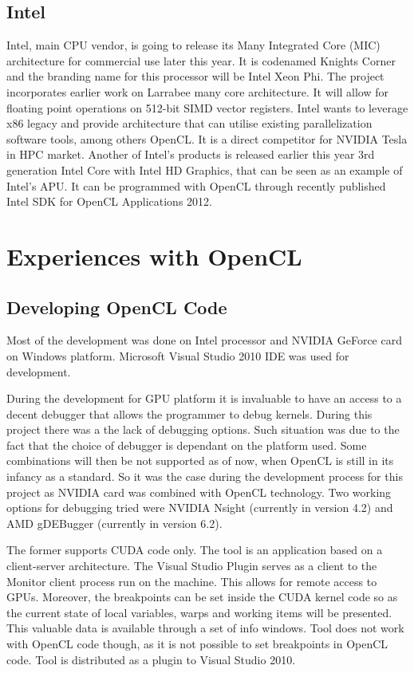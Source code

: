 \subsection{Intel}
Intel, main CPU vendor, is going to release its Many Integrated Core (MIC) architecture for commercial use later this year.\cite{intel2012mic} It is codenamed Knights Corner and the branding name for this processor will be Intel Xeon Phi.\cite{xeon2012} The project incorporates earlier work on Larrabee many core architecture. It will allow for floating point operations on 512-bit SIMD vector registers. Intel wants to leverage x86 legacy and provide architecture that can utilise existing parallelization software tools, among others OpenCL. It is a direct competitor for NVIDIA Tesla in HPC market. Another of Intel's products is released earlier this year 3rd generation Intel Core with Intel HD Graphics, that can be seen as an example of Intel's APU. It can be programmed with OpenCL through recently published Intel SDK for OpenCL Applications 2012.\cite{intel2012openclapp}

\section{Experiences with OpenCL}
\subsection{Developing OpenCL Code}
Most of the development was done on Intel processor and NVIDIA GeForce card on Windows platform. Microsoft Visual Studio 2010 IDE was used for development.

During the development for GPU platform it is invaluable to have an access to a decent debugger that allows the programmer to debug kernels. During this project there was a the lack of debugging options. Such situation was due to the fact that the choice of debugger is dependant on the platform used. Some combinations will then be not supported as of now, when OpenCL is still in its infancy as a standard. So it was the case during the development process for this project as NVIDIA card was combined with OpenCL technology.  Two working options for debugging tried were NVIDIA Nsight (currently in version 4.2) and AMD gDEBugger (currently in version 6.2).\cite{nvidia2012nsight, amd2012gdeb}

The former supports CUDA code only. The tool is an application based on a client-server architecture.  The Visual Studio Plugin serves as a client to the Monitor client process run on the machine. This allows for remote access to GPUs. Moreover, the breakpoints can be set inside the CUDA kernel code so as the current state of local variables, warps and working items will be presented. This valuable data is available through a set of info windows. Tool does not work with OpenCL code though, as it is not possible to set breakpoints in OpenCL code. Tool is distributed as a plugin to Visual Studio 2010.

